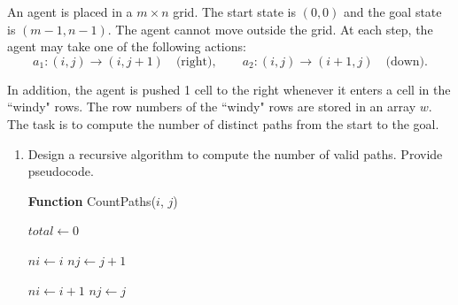 \documentclass[12pt,a4paper]{article}
\theoremstyle{definition}
\begin{document}
\begin{enumerate}
    An agent is placed in a $m \times n$ grid. The start state is $(0,0)$ and the goal state is $(m-1, n-1)$. The agent cannot move outside the grid. At each step, the agent may take one of the following actions:
    \[
    a_1: (i,j)\rightarrow(i,j+1) \quad \text{(right)}, \qquad
    a_2: (i,j)\rightarrow(i+1,j) \quad \text{(down)}.
    \]
    
    In addition, the agent is pushed 1 cell to the right whenever it enters a cell in the ``windy" rows. The row numbers of the ``windy" rows are stored in an array $w$.  The task is to compute the number of distinct paths from the start to the goal.

    \begin{enumerate}
        \item Design a recursive algorithm to compute the number of valid paths. Provide pseudocode.
        \begin{algorithm}[H]
            \LinesNumbered
            \BlankLine
            \caption{Count Paths in Windy World (Recursive)}
            \label{Algorithm: WindyWorldRecursive}
            
            
            \textbf{Function} CountPaths($i$, $j$)\;
            \Indp
                
                $total \leftarrow 0$\;

                \BlankLine
                $ni \leftarrow i$\;
                $nj \leftarrow j + 1$\;
                
                \BlankLine
                $ni \leftarrow i + 1$\;
                $nj \leftarrow j$\;
                

\end{algorithm}
\end{enumerate}
\end{enumerate}
\end{document}
